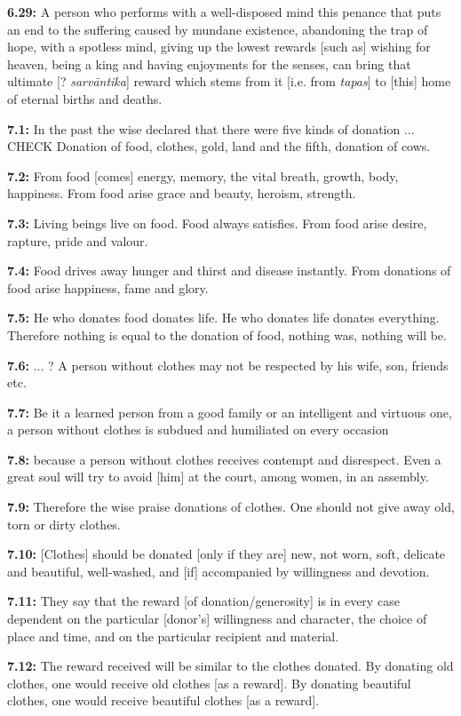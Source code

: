\documentclass{article}
\newcommand{\vsnum}[1]{\textbf{#1}}
\newcommand{\skt}[1]{\textit{#1}}
\begin{document}
\vsnum{6.29: }A person who performs with a well-disposed mind this penance that puts an end to the suffering caused by mundane existence, abandoning the trap of hope, with a spotless mind, giving up the lowest rewards [such as] wishing for heaven, being a king and having enjoyments for the senses, can bring that ultimate [? \skt{sarvāntika}] reward which stems from it [i.e. from \skt{tapas}] to [this] home of eternal births and deaths.


\vsnum{7.1: }In the past the wise declared that there were five kinds of donation ... CHECK Donation of food, clothes, gold, land and the fifth, donation of cows.

\vsnum{7.2: }From food [comes] energy, memory, the vital breath, growth, body, happiness. From food arise grace and beauty, heroism, strength.

\vsnum{7.3: }Living beings live on food. Food always satisfies. From food arise desire, rapture, pride and valour.

\vsnum{7.4: }Food drives away hunger and thirst and disease instantly. From donations of food arise happiness, fame and glory.

\vsnum{7.5: }He who donates food donates life. He who donates life donates everything. Therefore nothing is equal to the donation of food, nothing was, nothing will be.

\vsnum{7.6: }... ? A person without clothes may not be respected by his wife, son, friends etc.

\vsnum{7.7: }Be it a learned person from a good family or an intelligent and virtuous one, a person without clothes is subdued and humiliated on every occasion

\vsnum{7.8: }because a person without clothes receives contempt and disrespect. Even a great soul will try to avoid [him] at the court, among women, in an assembly.

\vsnum{7.9: }Therefore the wise praise donations of clothes. One should not give away old, torn or dirty clothes.

\vsnum{7.10: }[Clothes] should be donated [only if they are] new, not worn, soft, delicate and beautiful, well-washed, and [if] accompanied by willingness and devotion.

\vsnum{7.11: }They say that the reward [of donation/generosity] is in every case dependent on the particular [donor's] willingness and character, the choice of place and time, and on the particular recipient and material.

\vsnum{7.12: }The reward received will be similar to the clothes donated. By donating old clothes, one would receive old clothes [as a reward]. By donating beautiful clothes, one would receive beautiful clothes [as a reward].
\end{document}
